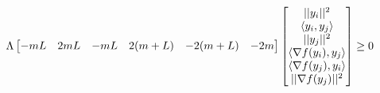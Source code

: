 \begin{equation} \label{eqn:int_cond2}
	\Lambda\begin{bmatrix}-mL & 2mL & -mL & 2(m+L) & -2(m+L) & -2m\end{bmatrix}\begin{bmatrix}||y_i||^2 \\ \langle y_i, y_j \rangle \\ ||y_j||^2 \\ \langle \nabla f(y_i), y_j \rangle \\ \langle \nabla f(y_j), y_i \rangle \\ ||\nabla f(y_j)||^2\end{bmatrix} \geq 0
\end{equation}

